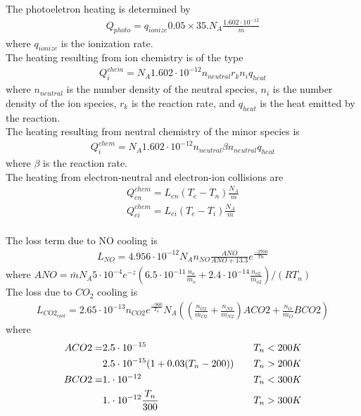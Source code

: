 The photoeletron heating is determined by
%
\begin{align}
  Q_{photo} = q_{ionize} 0.05 \times 35. N_A  \frac{1.602\cdot 10^{-12}}{\bar{m}}  
\end{align}
%
where  $q_{ionize}$ is the ionization rate.
%
\\
The heating resulting from ion chemistry is of the type
%
\begin{align}
  Q_{i}^{chem} = N_A 1.602\cdot 10^{-12}n_{neutral}r_k n_i q_{heat}  
\end{align}
%
where $n_{neutral}$ is the number density of the neutral species, $n_i$ is the
number density of the ion species, $r_k$ is the reaction rate, and $q_{heat}$ is
the heat emitted by the reaction.
%
\\
The heating resulting from neutral chemistry of the minor species is
%
\begin{align}
  Q_{i}^{chem} = N_A 1.602\cdot 10^{-12}n_{neutral}\beta n_{neutral} q_{heat}  
\end{align}
%
where $\beta$ is the reaction rate.
%
\\
The heating from electron-neutral and electron-ion collisions are
%
\begin{align}
  Q_{en}^{chem} = L_{en}(T_e-T_n) \frac{N_A}{\bar{m}} \\
  Q_{ei}^{chem} = L_{ei}(T_e-T_i) \frac{N_A}{\bar{m}} 
\end{align}
%
\\
The loss term due to NO cooling is
%
\begin{align}
  L_{NO} = 4.956 \cdot 10^{-12} N_A n_{NO}\frac{ANO}{ANO + 13.3} e^{\frac{-2700}{Tn}}
\end{align}
%
where $ANO = \bar{m} N_A 5 \cdot 10^{-4} e^{-z}(6.5 \cdot 10^{-11}\frac{n_o}{m_o} +
2.4 \cdot 10^{-14}\frac{n_{o2}}{m_{o2}})/(R T_n)$
%
\\
The loss due to $CO_2$ cooling is
%
\begin{align}
  L_{CO2_{cool}} = 2.65 \cdot 10^{-13} n_{CO2} e^{\frac{-960}{T_n}} N_A 
     ((\frac{n_{O2}}{m_{O2}} + \frac{n_{N2}}{m_{N2}})ACO2 + \frac{n_{O}}{m_{O}} BCO2)
\end{align}
%
where 
%
\begin{align}
   ACO2 = & 2.5 \cdot 10^{-15} & \quad T_n < 200 K \notag \\
   {}     &2.5 \cdot 10^{-15}(1+0.03(T_n-200))& \quad T_n > 200 K \notag \\
   BCO2 = & 1.\cdot 10^{-12} & \quad  T_n < 300 K  \notag\\
   {}     &1.\cdot 10^{-12}\frac{T_n}{300}& \quad T_n > 300 K \notag 
\end{align}
